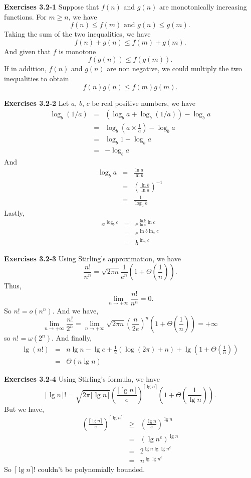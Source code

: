 \documentclass[a4paper,12pt]{article}
\newcommand{\newpar}[1]
{\bigskip \noindent \textbf{Exercises #1} \newline}
\begin{document}
\newpar{3.2-1}
Suppose that $f(n)$ and $g(n)$ are monotonically increasing
functions.  For $m \ge n$, we have
\[ f(n) \le f(m) \mbox{ and } g(n) \le g(m).\]
Taking the sum of the two inequalities, we have
\[ f(n) + g(n) \le f(m) + g(m).\]
And given that $f$ is monotone
\[ f(g(n)) \le f(g(m)).\]
If in addition, $f(n)$ and $g(n)$ are non negative, we could multiply
the two inequalities to obtain
\[ f(n) g(n)  \le f(m) g(m).\]

\newpar{3.2-2}
Let $a$, $b$, $c$ be real positive numbers, we have
\begin{eqnarray*}
\log_b(1/a) &=& (\log_ba + \log_b(1/a)) - \log_b a \\
&=& \log_b\left(a \times \frac{1}{a}\right) - \log_b a \\
&=& \log_b 1 - \log_b a \\
&=& -\log_b a
\end{eqnarray*}
And 
\begin{eqnarray*}
\log_ba &=& \frac{\ln a}{\ln b} \\
&=& \left(\frac{\ln b}{\ln a}\right)^{-1} \\
&=& \frac{1}{\log_a b}
\end{eqnarray*}
Lastly,
\begin{eqnarray*}
a^{\log_b c} &=& e^{\frac{\ln b}{\ln a} \ln c} \\
&=& e^{\ln b \ln_a c} \\
&=& b^{\ln_a c}
\end{eqnarray*}

\newpar{3.2-3}
Using Stirling's approximation, we have
\[ \frac{n!}{n^n} = \sqrt{2\pi n}\frac{1}{e^n}
\left(1 + \Theta\left(\frac{1}{n}\right)\right).\]
Thus,
\[ \lim_{n \to +\infty}\frac{n!}{n^n} = 0.\]
So $n! = o(n^n)$.  And we have,
\[ \lim_{n \to +\infty}\frac{n!}{2^n} =
\lim_{n \to +\infty}\sqrt{2\pi n}\left(\frac{n}{2e}\right)^n
\left(1 + \Theta\left(\frac{1}{n}\right)\right) = +\infty
\]
so $n! = \omega(2^n)$.  And finally,
\begin{eqnarray*}
\lg(n!) &=& n \lg n - \lg e + \frac{1}{2} (\log(2\pi) + n)
+ \lg\left(1 + \Theta\left(\frac{1}{n}\right)\right) \\
&=& \Theta(n \lg n)
\end{eqnarray*}

\newpar{3.2-4}
Using Stirling's formula, we have
 \[\lceil \lg n \rceil ! = \sqrt{2\pi \lceil \lg n \rceil}
\left(\frac{\lceil \lg n\rceil}{e}\right)^{\lceil \lg n\rceil}
\left(1 + \Theta\left(\frac{1}{\lg n}\right)\right).\]
But we have,
\begin{eqnarray*}
\left(\frac{\lceil \lg n\rceil}{e}\right)^{\lceil \lg n \rceil} &\ge&
\left(\frac{\lg n}{e}\right)^{\lg n} \\ &=&
(\lg n^e)^{\lg n} \\ &=&
2^{\lg n \lg \lg n^e} \\ &=&
n^{\lg \lg n^e}
\end{eqnarray*}
So $\lceil \lg n \rceil !$ couldn't be polynomially bounded.
\end{document}
